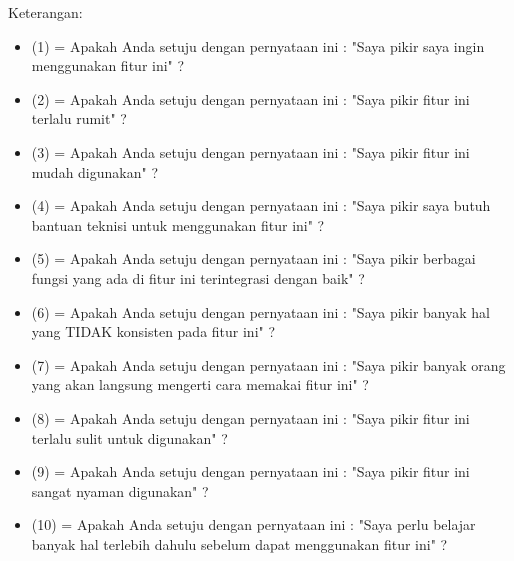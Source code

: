Keterangan:
\begin{itemize}
\item (1) = Apakah Anda setuju dengan pernyataan ini : "Saya pikir saya ingin menggunakan fitur ini" ?
\item (2) = Apakah Anda setuju dengan pernyataan ini : "Saya pikir fitur ini terlalu rumit" ?
\item (3) = Apakah Anda setuju dengan pernyataan ini : "Saya pikir fitur ini mudah digunakan" ?
\item (4) = Apakah Anda setuju dengan pernyataan ini : "Saya pikir saya butuh bantuan teknisi untuk menggunakan fitur ini" ?
\item (5) = Apakah Anda setuju dengan pernyataan ini : "Saya pikir berbagai fungsi yang ada di fitur ini terintegrasi dengan baik" ?
\item (6) = Apakah Anda setuju dengan pernyataan ini : "Saya pikir banyak hal yang TIDAK konsisten pada fitur ini" ?
\item (7) = Apakah Anda setuju dengan pernyataan ini : "Saya pikir banyak orang yang akan langsung mengerti cara memakai fitur ini" ?
\item (8) = Apakah Anda setuju dengan pernyataan ini : "Saya pikir fitur ini terlalu sulit untuk digunakan" ?
\item (9) = Apakah Anda setuju dengan pernyataan ini : "Saya pikir fitur ini sangat nyaman digunakan" ?
\item (10) = Apakah Anda setuju dengan pernyataan ini : "Saya perlu belajar banyak hal terlebih dahulu sebelum dapat menggunakan fitur ini" ?							
\end{itemize}

